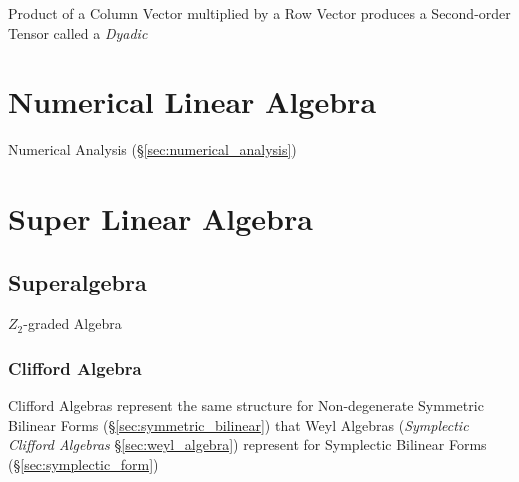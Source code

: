 Product of a Column Vector multiplied by a Row Vector produces a Second-order
Tensor called a \emph{Dyadic}



\section{Numerical Linear Algebra}\label{sec:numerical_linear_algebra}

\fist Numerical Analysis (\S\ref{sec:numerical_analysis})



\section{Super Linear Algebra}\label{sec:super_linear_algebra}

\subsection{Superalgebra}\label{sec:superalgebra}

$Z_2$-graded Algebra



\subsubsection{Clifford Algebra}\label{sec:clifford_algebra}

Clifford Algebras represent the same structure for Non-degenerate Symmetric
Bilinear Forms (\S\ref{sec:symmetric_bilinear}) that Weyl Algebras
(\emph{Symplectic Clifford Algebras} \S\ref{sec:weyl_algebra}) represent for
Symplectic Bilinear Forms (\S\ref{sec:symplectic_form})

